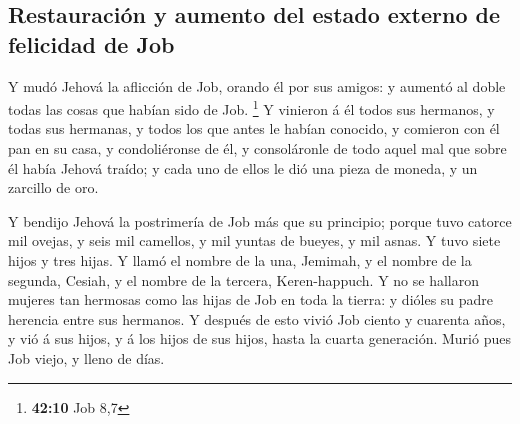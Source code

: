 \hypertarget{restauraciuxf3n-y-aumento-del-estado-externo-de-felicidad-de-job}{%
\subsection{Restauración y aumento del estado externo de felicidad de
Job}\label{restauraciuxf3n-y-aumento-del-estado-externo-de-felicidad-de-job}}

 Y mudó Jehová la aflicción de Job, orando él por sus
amigos: y aumentó al doble todas las cosas que habían sido de Job.
\footnote{\textbf{42:10} Job 8,7}  Y vinieron á él todos
sus hermanos, y todas sus hermanas, y todos los que antes le habían
conocido, y comieron con él pan en su casa, y condoliéronse de él, y
consoláronle de todo aquel mal que sobre él había Jehová traído; y cada
uno de ellos le dió una pieza de moneda, y un zarcillo de oro.

 Y bendijo Jehová la postrimería de Job más que su
principio; porque tuvo catorce mil ovejas, y seis mil camellos, y mil
yuntas de bueyes, y mil asnas.  Y tuvo siete hijos y tres
hijas.  Y llamó el nombre de la una, Jemimah, y el nombre
de la segunda, Cesiah, y el nombre de la tercera, Keren-happuch.
 Y no se hallaron mujeres tan hermosas como las hijas de
Job en toda la tierra: y dióles su padre herencia entre sus hermanos.
 Y después de esto vivió Job ciento y cuarenta años, y vió
á sus hijos, y á los hijos de sus hijos, hasta la cuarta generación.
 Murió pues Job viejo, y lleno de días.

